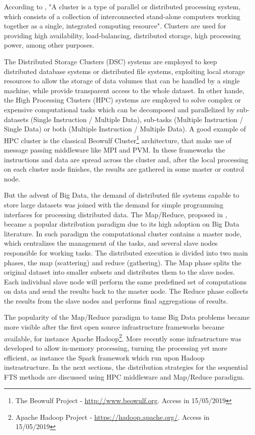 According to \cite{Baker1999}, "A cluster is a type of parallel or distributed processing system, which consists of a collection of interconnected stand-alone computers working together as a single, integrated computing resource". Clusters are used for providing high availability, load-balancing, distributed storage, high processing power, among other purposes.

The Distributed Storage Clusters (DSC) systems are employed to keep distributed database systems or distributed file systems, exploiting local storage resources to allow the storage of data volumes that can be handled by a single machine, while provide transparent access to the whole dataset. In other hande, the High Processing Clusters (HPC) systems are employed to solve complex or expensive computational tasks which can be decomposed and parallelized by sub-datasets (Single Instruction / Multiple Data), sub-tasks (Multiple Instruction / Single Data) or both (Multiple Instruction / Multiple Data). A good example of HPC cluster is the classical Beowulf Cluster\footnote{The Beowulf Project - \url{http://www.beowulf.org}. Access in 15/05/2019} architecture, that make use of message passing middleware like MPI and PVM. In these frameworks the instructions and data are spread across the cluster and, after the local processing on each cluster node finishes, the results are gathered in some master or control node. 

But the advent of Big Data, the demand of distributed file systems capable to store large datasets was joined with the demand for simple programming interfaces for processing distributed data. The Map/Reduce, proposed in \cite{Dean2008}, became a popular distribution paradigm due to its high adoption on Big Data literature. In such paradigm the computational cluster contains a master node, which centralizes the management of the tasks, and several slave nodes responsible for working tasks. The distributed execution is divided into two main phases, the map (scattering) and reduce (gathering). The Map phase splits the original dataset into smaller subsets and distributes them to the slave nodes. Each individual slave node will perform the same predefined set of computations on data and send the results back to the master node. The Reduce phase collects the results from the slave nodes and performs final aggregations of results.

The popularity of the Map/Reduce paradigm to tame Big Data problems became more visible after the first open source infrastructure frameworks became available, for instance Apache Hadoop\footnote{Apache Hadoop Project - \url{https://hadoop.apache.org/}. Access in 15/05/2019}. More recently some infrastructure was developed to allow in-memory processing, turning the processing yet more efficient, as instance the Spark framework which run upon Hadoop instrastructure. In the next sections, the distribution strategies for the sequential FTS methods are discussed using HPC middleware and Map/Reduce paradigm.


